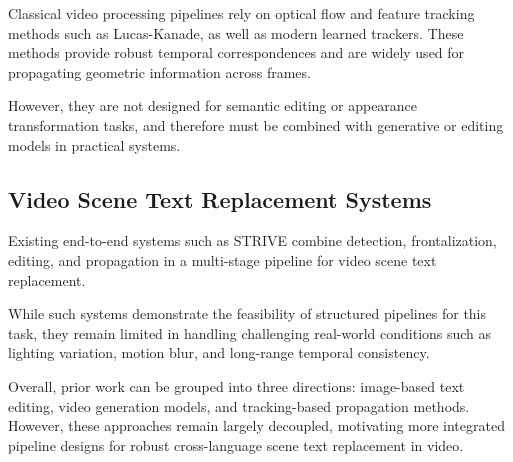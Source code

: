 Classical video processing pipelines rely on optical flow and feature tracking methods such as Lucas-Kanade, as well as modern learned trackers. These methods provide robust temporal correspondences and are widely used for propagating geometric information across frames.

However, they are not designed for semantic editing or appearance transformation tasks, and therefore must be combined with generative or editing models in practical systems.

\subsection{Video Scene Text Replacement Systems}

Existing end-to-end systems such as STRIVE \cite{strive} combine detection, frontalization, editing, and propagation in a multi-stage pipeline for video scene text replacement.

While such systems demonstrate the feasibility of structured pipelines for this task, they remain limited in handling challenging real-world conditions such as lighting variation, motion blur, and long-range temporal consistency.



Overall, prior work can be grouped into three directions: image-based text editing, video generation models, and tracking-based propagation methods. However, these approaches remain largely decoupled, motivating more integrated pipeline designs for robust cross-language scene text replacement in video.
